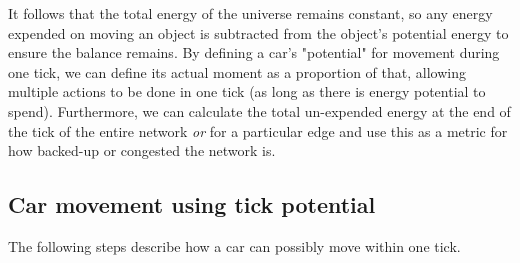 \noindent It follows that the total energy of the universe remains constant, so any energy expended on moving an object is subtracted from the object's potential energy to ensure the balance remains.  By defining a car's "potential" for movement during one tick, we can define its actual moment as a proportion of that, allowing multiple actions to be done in one tick (as long as there is energy potential to spend).  Furthermore, we can calculate the total un-expended energy at the end of the tick of the entire network \textit{or} for a particular edge and use this as a metric for how backed-up or congested the network is. \\

\subsection{Car movement using tick potential}
\par The following steps describe how a car can possibly move within one tick.
